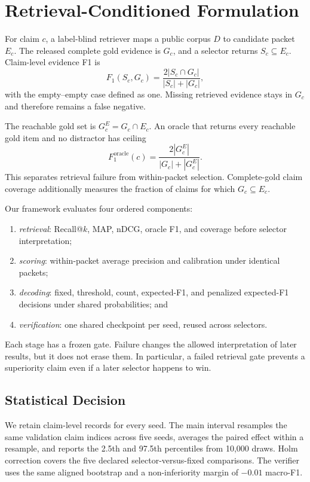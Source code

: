 \section{Retrieval-Conditioned Formulation}

For claim $c$, a label-blind retriever maps a public corpus $D$ to candidate packet $E_c$. The released complete gold evidence is $G_c$, and a selector returns $S_c\subseteq E_c$. Claim-level evidence F1 is
\begin{equation}
F_1(S_c,G_c)=\frac{2|S_c\cap G_c|}{|S_c|+|G_c|},
\label{eq:set-f1}
\end{equation}
with the empty--empty case defined as one. Missing retrieved evidence stays in $G_c$ and therefore remains a false negative.

The reachable gold set is $G_c^E=G_c\cap E_c$. An oracle that returns every reachable gold item and no distractor has ceiling
\begin{equation}
F_1^{\mathrm{oracle}}(c)=\frac{2|G_c^E|}{|G_c|+|G_c^E|}.
\label{eq:oracle}
\end{equation}
This separates retrieval failure from within-packet selection. Complete-gold claim coverage additionally measures the fraction of claims for which $G_c\subseteq E_c$.

Our framework evaluates four ordered components:
\begin{enumerate}
    \item \emph{retrieval}: Recall@$k$, MAP, nDCG, oracle F1, and coverage before selector interpretation;
    \item \emph{scoring}: within-packet average precision and calibration under identical packets;
    \item \emph{decoding}: fixed, threshold, count, expected-F1, and penalized expected-F1 decisions under shared probabilities; and
    \item \emph{verification}: one shared checkpoint per seed, reused across selectors.
\end{enumerate}

Each stage has a frozen gate. Failure changes the allowed interpretation of later results, but it does not erase them. In particular, a failed retrieval gate prevents a superiority claim even if a later selector happens to win.

\subsection{Statistical Decision}

We retain claim-level records for every seed. The main interval resamples the same validation claim indices across five seeds, averages the paired effect within a resample, and reports the 2.5th and 97.5th percentiles from 10,000 draws. Holm correction covers the five declared selector-versus-fixed comparisons. The verifier uses the same aligned bootstrap and a non-inferiority margin of $-0.01$ macro-F1.
